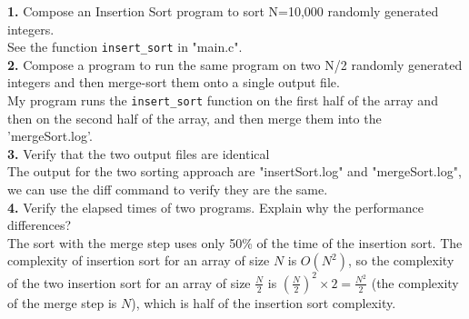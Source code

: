 \documentclass{article}
\begin{document}
\noindent\textbf{1.} Compose an Insertion Sort program to sort N=10,000 randomly generated integers.\\
\indent See the function \texttt{insert\_sort} in "main.c".\\

\noindent\textbf{2.} Compose a program to run the same program on two N/2 randomly generated integers and then merge-sort them onto a single output file.\\
\indent My program runs the \texttt{insert\_sort} function on the first half of the array and then on the second half of the array, and then merge them into the 'mergeSort.log'. \\

\noindent\textbf{3.} Verify that the two output files are identical\\
\indent The output for the two sorting approach are "insertSort.log" and "mergeSort.log", we can use the diff command to verify they are the same.\\

\noindent\textbf{4.} Verify the elapsed times of two programs. Explain why the performance differences?\\
\indent The sort with the merge step uses only 50\% of the time of the insertion sort. The complexity of insertion sort for an array of size $N$ is $O(N^2)$, so the complexity of the two insertion sort for an array of size $\frac{N}{2}$ is $\left(\frac{N}{2}\right)^2\times 2=\frac{N^2}{2}$ (the complexity of the merge step is $N$), which is half of the insertion sort complexity.\\
\end{document}
